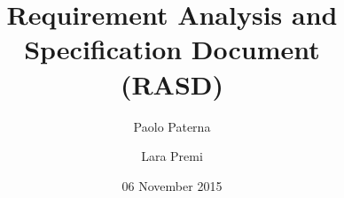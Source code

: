 \documentclass[12pt,a4paper]{article}
\begin{document}
	\title{Requirement Analysis and Specification Document\\
		(RASD)}
	\author{Paolo Paterna \and Lara Premi}
	\date{06 November 2015}
	\maketitle
	\newpage
	\tableofcontents
	\newpage
	
	
	
	
	
	
	
\end{document}
